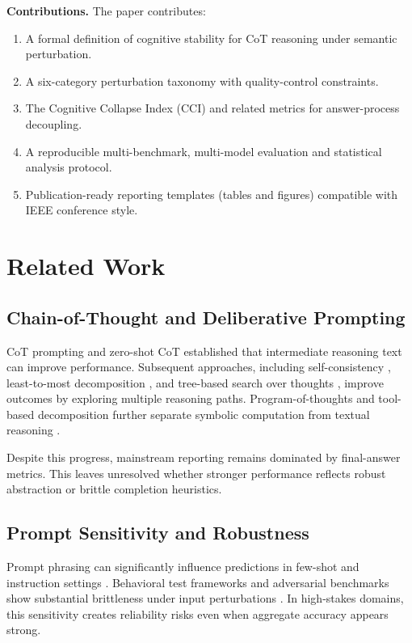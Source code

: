 \documentclass[conference]{IEEEtran}
\begin{document}
\textbf{Contributions.} The paper contributes:
\begin{enumerate}[leftmargin=*]
\item A formal definition of cognitive stability for CoT reasoning under semantic perturbation.
\item A six-category perturbation taxonomy with quality-control constraints.
\item The Cognitive Collapse Index (CCI) and related metrics for answer-process decoupling.
\item A reproducible multi-benchmark, multi-model evaluation and statistical analysis protocol.
\item Publication-ready reporting templates (tables and figures) compatible with IEEE conference style.
\end{enumerate}

\section{Related Work}
\subsection{Chain-of-Thought and Deliberative Prompting}
CoT prompting \cite{wei2022cot} and zero-shot CoT \cite{kojima2022zeroshot} established that intermediate reasoning text can improve performance. Subsequent approaches, including self-consistency \cite{wang2022selfconsistency}, least-to-most decomposition \cite{zhou2022least}, and tree-based search over thoughts \cite{yao2023tot}, improve outcomes by exploring multiple reasoning paths. Program-of-thoughts and tool-based decomposition further separate symbolic computation from textual reasoning \cite{chen2022pot,gao2023pal}.

Despite this progress, mainstream reporting remains dominated by final-answer metrics. This leaves unresolved whether stronger performance reflects robust abstraction or brittle completion heuristics.

\subsection{Prompt Sensitivity and Robustness}
Prompt phrasing can significantly influence predictions in few-shot and instruction settings \cite{zhao2021calibrate,min2022rethinking}. Behavioral test frameworks and adversarial benchmarks show substantial brittleness under input perturbations \cite{ribeiro2020checklist,si2023promptbench}. In high-stakes domains, this sensitivity creates reliability risks even when aggregate accuracy appears strong.
\end{document}
